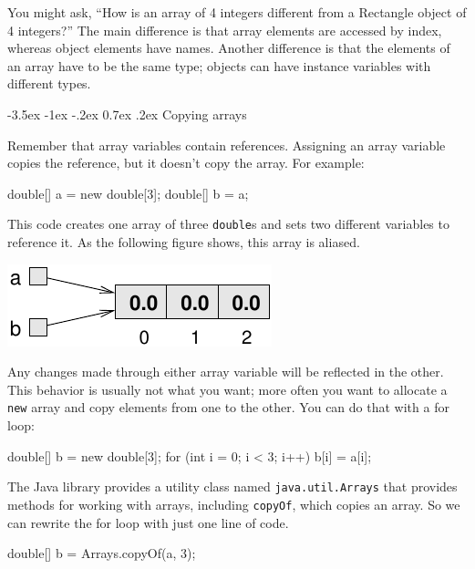 \documentclass[12pt]{book}
\makeatletter
\theoremstyle{exercise}
\newcommand{\java}[1]{\verb"#1"}
\renewcommand{\section}{\@startsection{section}{1}{\z@}%
    {-3.5ex \@plus -1ex \@minus -.2ex}%
    {0.7ex \@plus.2ex}%
    {\normalfont\Large\bfseries}}
\newcommand{\java}[1]{\lstinline{#1}} %
\makeatother
\begin{document}
You might ask, ``How is an array of 4 integers different from a Rectangle object of 4 integers?''
The main difference is that array elements are accessed by index, whereas object elements have names.
Another difference is that the elements of an array have to be the same type; objects can have instance variables with different types.


\section{Copying arrays}

Remember that array variables contain references.
Assigning an array variable copies the reference, but it doesn't copy the array.
For example:

\begin{code}
    double[] a = new double[3];
    double[] b = a;
\end{code}

This code creates one array of three \java{double}s and sets two different variables to reference it.
As the following figure shows, this array is aliased.

\begin{center}
\includegraphics{figs/array3.pdf}
\end{center}

Any changes made through either array variable will be reflected in the other.
This behavior is usually not what you want; more often you want to allocate a \java{new} array and copy elements from one to the other.
You can do that with a for loop:

\begin{code}
    double[] b = new double[3];
    for (int i = 0; i < 3; i++) {
        b[i] = a[i];
    }
\end{code}


The Java library provides a utility class named \java{java.util.Arrays} that provides methods for working with arrays, including \java{copyOf}, which copies an array.
So we can rewrite the for loop with just one line of code.

\begin{code}
    double[] b = Arrays.copyOf(a, 3);
\end{code}
\end{document}
